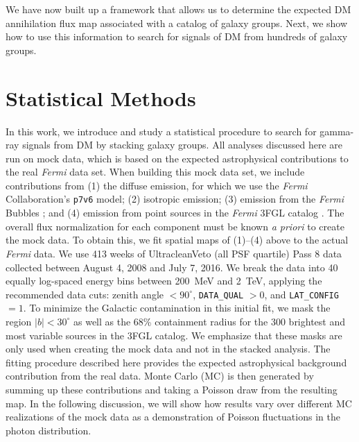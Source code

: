 We have now built up a framework that allows us to determine the expected DM annihilation flux map associated with a catalog of galaxy groups.  Next, we show how to use this information to search for signals of DM  from hundreds of galaxy groups.  

\section{Statistical Methods}
\label{sec:stats}


In this work, we introduce and study a statistical procedure to search for gamma-ray signals from DM by stacking galaxy groups.  All analyses discussed here are run on mock data, which is based on the expected astrophysical contributions to the real \emph{Fermi} data set. When building this mock data set, we include contributions from (1) the diffuse  emission, for which we use the \textit{Fermi} Collaboration's \texttt{p7v6} model; (2) isotropic emission;  (3) emission from the \textit{Fermi} Bubbles \cite{Su:2010qj}; and (4) emission from point sources in the \textit{Fermi} 3FGL catalog \cite{Acero:2015hja}. The overall flux normalization  for each component must be known \emph{a priori} to create the mock data. To obtain this, we fit spatial maps of (1)--(4) above to the actual \emph{Fermi} data.  We use 413 weeks of UltracleanVeto (all PSF quartile) Pass 8 data collected between August 4, 2008 and July 7, 2016. We break the data into 40 equally log-spaced energy bins between 200~MeV and 2~TeV, applying the recommended data cuts: zenith angle $< 90^{\circ}$, \texttt{DATA\_QUAL} $> 0$, and \texttt{LAT\_CONFIG} $=1$.  To minimize the Galactic contamination in this initial fit, we mask the region $|b|<30^{\circ}$ as well as the 68\% containment radius for the 300 brightest and most variable sources in the 3FGL catalog. We emphasize that these masks are only used when creating the mock data and not in the stacked analysis. The fitting procedure described here provides the expected astrophysical background contribution from the real data.  Monte Carlo (MC) is then generated by summing up these contributions and taking a Poisson draw from the resulting map.  In the following discussion, we will show how results vary over different MC realizations of the mock data as a demonstration of Poisson fluctuations in the photon distribution. 

